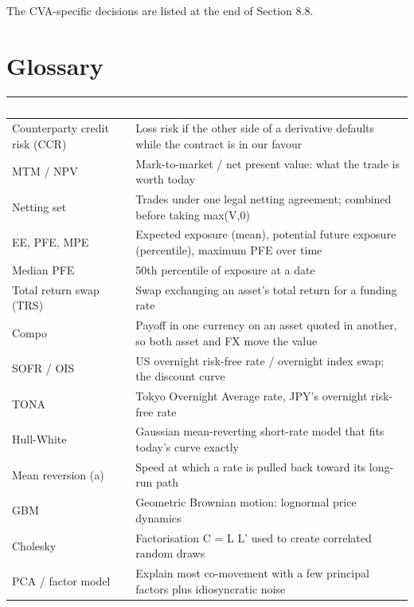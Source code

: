 \documentclass[11pt,letterpaper]{article}
\begin{document}
The CVA-specific decisions are listed at the end of Section 8.8.

\clearpage
\clearpage
\appendix
\section{Glossary}
{\footnotesize\setlength{\LTpre}{4pt}\setlength{\LTpost}{6pt}
\begin{longtable}{>{\raggedright\arraybackslash}p{}>{\raggedright\arraybackslash}p{}}
\toprule
\rowcolor{navy}\textbf{\textcolor{white}{Term}} & \textbf{\textcolor{white}{Meaning}} \\
\endhead
Counterparty credit risk (CCR) & Loss risk if the other side of a derivative defaults while the contract is in our favour \\
\rowcolor{gray!9}MTM / NPV & Mark-to-market / net present value: what the trade is worth today \\
Netting set & Trades under one legal netting agreement; combined before taking max(V,0) \\
\rowcolor{gray!9}EE, PFE, MPE & Expected exposure (mean), potential future exposure (percentile), maximum PFE over time \\
Median PFE & 50th percentile of exposure at a date \\
\rowcolor{gray!9}Total return swap (TRS) & Swap exchanging an asset's total return for a funding rate \\
Compo & Payoff in one currency on an asset quoted in another, so both asset and FX move the value \\
\rowcolor{gray!9}SOFR / OIS & US overnight risk-free rate / overnight index swap; the discount curve \\
TONA & Tokyo Overnight Average rate, JPY's overnight risk-free rate \\
\rowcolor{gray!9}Hull-White & Gaussian mean-reverting short-rate model that fits today's curve exactly \\
Mean reversion (a) & Speed at which a rate is pulled back toward its long-run path \\
\rowcolor{gray!9}GBM & Geometric Brownian motion: lognormal price dynamics \\
Cholesky & Factorisation C = L L' used to create correlated random draws \\
\rowcolor{gray!9}PCA / factor model & Explain most co-movement with a few principal factors plus idiosyncratic noise \\

\end{longtable}}
\end{document}
